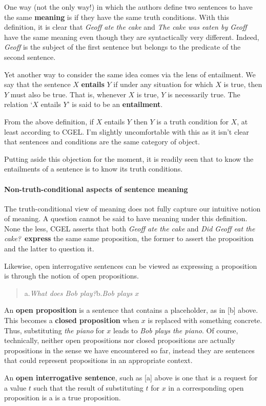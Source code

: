 \documentclass{scrarticle}
\begin{document}
One way (not the only way!) in which the authors define two sentences to have the same
\textbf{meaning} is if they have the same truth conditions. With this definition, it is clear that
\emph{Geoff ate the cake} and \emph{The cake was eaten by Geoff} have the same meaning even though
they are syntactically very different. Indeed, \emph{Geoff} is the subject of the first sentence but
belongs to the predicate of the second sentence.

Yet another way to consider the same idea comes via the lens of entailment. We say that the sentence
$X$ \textbf{entails} $Y$ if under any situation for which $X$ is true, then $Y$ must also be true.
That is, whenever $X$ is true, $Y$ is necessarily true. The relation `$X$ entails $Y$' is said to be
an \textbf{entailment}.

From the above definition, if $X$ entails $Y$ then $Y$ is a truth condition for $X$, at least
according to CGEL. I'm slightly uncomfortable with this as it isn't clear that sentences and
conditions are the same category of object.

Putting aside this objection for the moment, it is readily seen that to know the entailments of a
sentence is to know its truth conditions.

\paragraph{Non-truth-conditional aspects of sentence meaning}

The truth-conditional view of meaning does not fully capture our intuitive notion of meaning. A
question cannot be said to have meaning under this definition. None the less, CGEL asserts that both
\emph{Geoff ate the cake} and \emph{Did Geoff eat the cake?}\ \textbf{express} the same same
proposition, the former to assert the proposition and the latter to question it.

Likewise,  open interrogative sentences can be viewed as expressing a proposition is through the
notion of open propositions. 

\begin{quote}
    a.\;\emph{What does Bob play?}\qquad b.\;\emph{Bob plays $x$}
\end{quote}

An \textbf{open proposition} is a sentence that contains a placeholder, as in [b] above.  This
becomes a \textbf{closed proposition} when $x$ is replaced with something concrete. Thus,
substituting \emph{the piano} for $x$ leads to \emph{Bob plays the piano}. Of course, technically,
neither open propositions nor closed propositions are actually propositions in the sense we have
encountered so far, instead they are sentences that could represent propositions in an appropriate
context. 

An \textbf{open interrogative sentence}, such as [a] above is one that is a request for a value $t$
such that the result of substituting $t$ for $x$ in a corresponding open proposition is a is a true
proposition.
\end{document}
